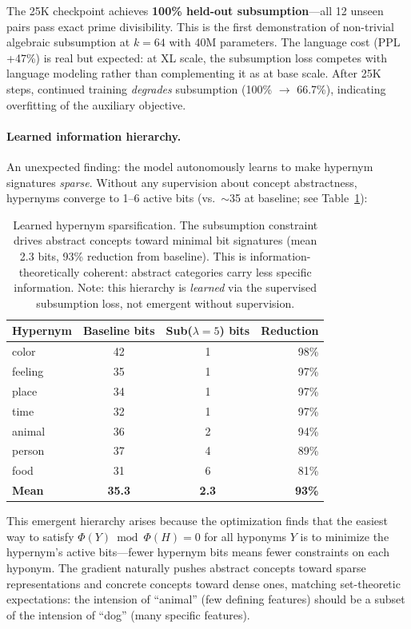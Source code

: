 \documentclass[11pt,a4paper]{article}
\begin{document}
The 25K checkpoint achieves \textbf{100\% held-out subsumption}---all 12 unseen pairs pass exact prime divisibility. This is the first demonstration of non-trivial algebraic subsumption at $k=64$ with 40M parameters. The language cost (PPL +47\%) is real but expected: at XL scale, the subsumption loss competes with language modeling rather than complementing it as at base scale. After 25K steps, continued training \emph{degrades} subsumption (100\% $\rightarrow$ 66.7\%), indicating overfitting of the auxiliary objective.

\paragraph{Learned information hierarchy.} An unexpected finding: the model autonomously learns to make hypernym signatures \emph{sparse}. Without any supervision about concept abstractness, hypernyms converge to 1--6 active bits (vs.\ $\sim$35 at baseline; see Table~\ref{tab:hierarchy}):

\begin{table}[h]
\centering
\caption{Learned hypernym sparsification. The subsumption constraint drives abstract concepts toward minimal bit signatures (mean 2.3 bits, 93\% reduction from baseline). This is information-theoretically coherent: abstract categories carry less specific information. Note: this hierarchy is \emph{learned} via the supervised subsumption loss, not emergent without supervision.}
\label{tab:hierarchy}
\begin{tabular}{lccr}
\toprule
Hypernym & Baseline bits & Sub($\lambda=5$) bits & Reduction \\
\midrule
color   & 42 & 1 & 98\% \\
feeling & 35 & 1 & 97\% \\
place   & 34 & 1 & 97\% \\
time    & 32 & 1 & 97\% \\
animal  & 36 & 2 & 94\% \\
person  & 37 & 4 & 89\% \\
food    & 31 & 6 & 81\% \\
\midrule
\textbf{Mean} & \textbf{35.3} & \textbf{2.3} & \textbf{93\%} \\
\bottomrule
\end{tabular}
\end{table}

This emergent hierarchy arises because the optimization finds that the easiest way to satisfy $\Phi(Y) \bmod \Phi(H) = 0$ for all hyponyms $Y$ is to minimize the hypernym's active bits---fewer hypernym bits means fewer constraints on each hyponym. The gradient naturally pushes abstract concepts toward sparse representations and concrete concepts toward dense ones, matching set-theoretic expectations: the intension of ``animal'' (few defining features) should be a subset of the intension of ``dog'' (many specific features).
\end{document}
